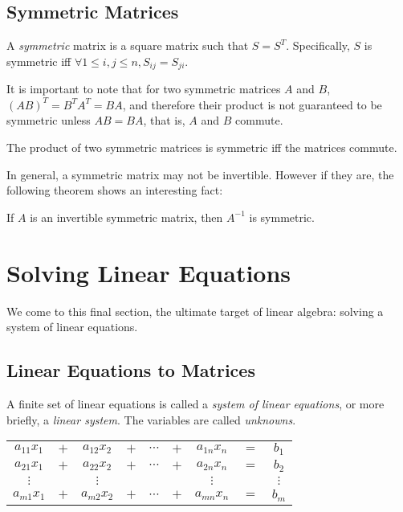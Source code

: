 \documentclass{report}
\begin{document}
		\subsection{Symmetric Matrices}
		A \emph{symmetric} matrix is a square matrix such that $S=S^T$. Specifically, $S$ is symmetric iff $\forall 1 \le i,j \le n, S_{ij}=S_{ji}$.
		
		It is important to note that for two symmetric matrices $A$ and $B$, $(AB)^T=B^TA^T=BA$, and therefore their product is not guaranteed to be symmetric unless $AB=BA$, that is, $A$ and $B$ commute.
		
		\begin{thm}
			The product of two symmetric matrices is symmetric iff the matrices commute.
		\end{thm}
		
		In general, a symmetric matrix may not be invertible. However if they are, the following theorem shows an interesting fact:
		
		\begin{thm}
			If $A$ is an invertible symmetric matrix, then $A^{-1}$ is symmetric.
		\end{thm}
	
	\section{Solving Linear Equations}
	We come to this final section, the ultimate target of linear algebra: solving a system of linear equations.
		\subsection{Linear Equations to Matrices}
		A finite set of linear equations is called a \emph{system of linear equations}, or more briefly, a \emph{linear system}. The variables are called \emph{unknowns}.
		
		\begin{center}
			\begin{tabular}{ccccccccc}
				$a_{11}x_1$ & $+$ & $a_{12}x_2$ & $+$ & $\cdots$ & $+$ & $a_{1n}x_n$ & $=$ & $b_1$    \\
				$a_{21}x_1$ & $+$ & $a_{22}x_2$ & $+$ & $\cdots$ & $+$ & $a_{2n}x_n$ & $=$ & $b_2$    \\
				$\vdots$    &     & $\vdots$   &     &          &     & $\vdots$    &     & $\vdots$ \\
				$a_{m1}x_1$ & $+$ & $a_{m2}x_2$ & $+$ & $\cdots$ & $+$ & $a_{mn}x_n$ & $=$ & $b_m$   
			\end{tabular}
		\end{center}
		
\end{document}
